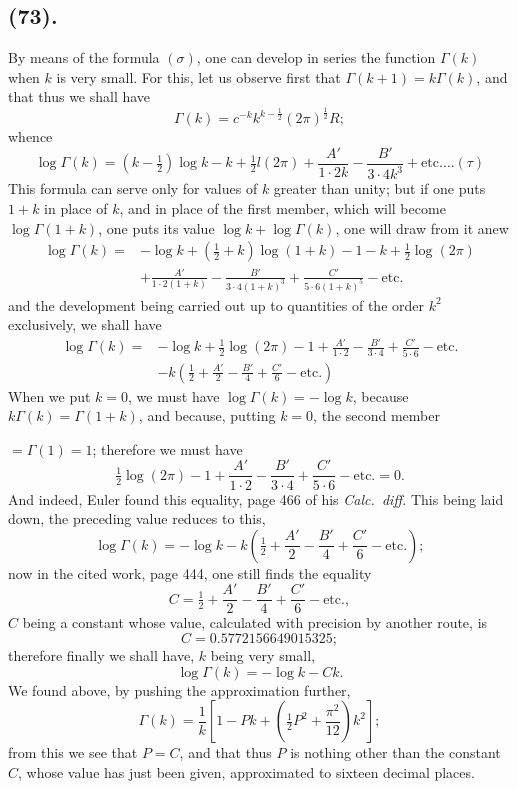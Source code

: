 \documentclass{article}
\begin{document}
\subsection*{(73).}

By means of the formula $(\sigma)$, one can develop in series the function $\Gamma(k)$ when $k$ is very small. For this, let us observe first that $\Gamma(k+1)=k\Gamma(k)$, and that thus we shall have
\[ \Gamma(k)=c^{-k}k^{k-\frac{1}{2}}(2\pi)^{\frac{1}{2}}R; \]
whence
\[ \log\Gamma(k)=(k-\tfrac{1}{2})\log k-k+\tfrac{1}{2}l(2\pi)+\frac{A'}{1\cdot2k}-\frac{B'}{3\cdot4k^{3}}+\text{etc.}\ldots(\tau) \]
This formula can serve only for values of $k$ greater than unity; but if one puts $1+k$ in place of $k$, and in place of the first member, which will become $\log\Gamma(1+k)$, one puts its value $\log k+\log\Gamma(k)$, one will draw from it anew
\[ \begin{aligned} \log\Gamma(k)={}&-\log k+(\tfrac{1}{2}+k)\log(1+k)-1-k+\tfrac{1}{2}\log(2\pi)\\ &+\frac{A'}{1\cdot2(1+k)}-\frac{B'}{3\cdot4(1+k)^{3}}+\frac{C'}{5\cdot6(1+k)^{5}}-\text{etc.} \end{aligned} \]
and the development being carried out up to quantities of the order $k^{2}$ exclusively, we shall have
\[ \begin{aligned} \log\Gamma(k)={}&-\log k+\tfrac{1}{2}\log(2\pi)-1+\frac{A'}{1\cdot2}-\frac{B'}{3\cdot4}+\frac{C'}{5\cdot6}-\text{etc.}\\ &-k\left(\tfrac{1}{2}+\frac{A'}{2}-\frac{B'}{4}+\frac{C'}{6}-\text{etc.}\right) \end{aligned} \]
When we put $k=0$, we must have $\log\Gamma(k)=-\log k$, because $k\Gamma(k)=\Gamma(1+k)$, and because, putting $k=0$, the second member

$=\Gamma(1)=1$; therefore we must have
\[ \tfrac{1}{2}\log(2\pi)-1+\frac{A'}{1\cdot2}-\frac{B'}{3\cdot4}+\frac{C'}{5\cdot6}-\text{etc.}=0. \]
And indeed, Euler found this equality, page 466 of his \emph{Calc.\ diff.} This being laid down, the preceding value reduces to this,
\[ \log\Gamma(k)=-\log k-k\left(\tfrac{1}{2}+\frac{A'}{2}-\frac{B'}{4}+\frac{C'}{6}-\text{etc.}\right); \]
now in the cited work, page 444, one still finds the equality
\[ C=\tfrac{1}{2}+\frac{A'}{2}-\frac{B'}{4}+\frac{C'}{6}-\text{etc.}, \]
$C$ being a constant whose value, calculated with precision by another route, is
\[ C=0.5772156649015325; \]
therefore finally we shall have, $k$ being very small,
\[ \log\Gamma(k)=-\log k-Ck. \]
We found above, by pushing the approximation further,
\[ \Gamma(k)=\frac{1}{k}\left[1-Pk+\left(\tfrac{1}{2}P^{2}+\frac{\pi^{2}}{12}\right)k^{2}\right]; \]
from this we see that $P=C$, and that thus $P$ is nothing other than the constant $C$, whose value has just been given, approximated to sixteen decimal places.
\end{document}
